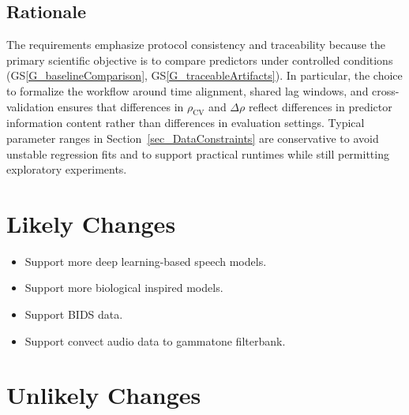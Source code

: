 \documentclass[12pt]{article}
\newcounter{lcnum} %
\begin{document}
\subsection{Rationale}


The requirements emphasize protocol consistency and traceability because the primary scientific objective is to compare predictors under controlled conditions (GS\ref{G_baselineComparison}, GS\ref{G_traceableArtifacts}). 
In particular, the choice to formalize the workflow around time alignment, shared lag windows, and cross-validation ensures that differences in $\rho_{\mathrm{CV}}$ and
$\Delta\rho$ reflect differences in predictor information content rather than differences in evaluation settings. 
Typical parameter ranges in Section~\ref{sec_DataConstraints} are conservative to avoid unstable regression fits and to support practical runtimes while still permitting exploratory experiments.

\section{Likely Changes}    

\noindent \begin{itemize}

\item[LC\refstepcounter{lcnum}\thelcnum\label{LC_meaningfulLabel}:] Support more deep learning-based speech models.

\item[LC\refstepcounter{lcnum}\thelcnum\label{LC_meaningfulLabel}:] Support more biological inspired models.

\item[LC\refstepcounter{lcnum}\thelcnum\label{LC_meaningfulLabel}:] Support BIDS data.

\item[LC\refstepcounter{lcnum}\thelcnum\label{LC_meaningfulLabel}:] Support convect audio data to gammatone filterbank.

\end{itemize}

\section{Unlikely Changes}    
\end{document}
